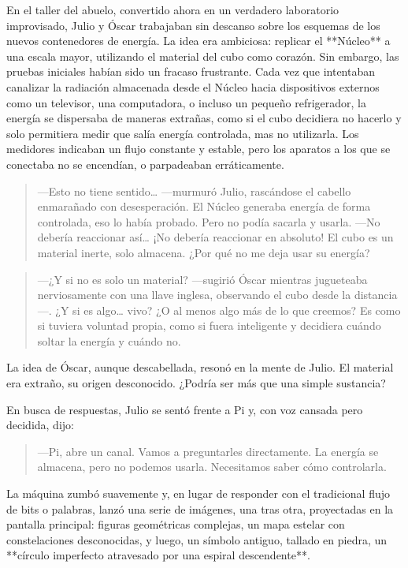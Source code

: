 \documentclass[a4paper,12pt]{book}
\begin{document}
En el taller del abuelo, convertido ahora en un verdadero laboratorio improvisado, Julio y Óscar trabajaban sin descanso sobre los esquemas de los nuevos contenedores de energía. La idea era ambiciosa: replicar el **Núcleo** a una escala mayor, utilizando el material del cubo como corazón. Sin embargo, las pruebas iniciales habían sido un fracaso frustrante. Cada vez que intentaban canalizar la radiación almacenada desde el Núcleo hacia dispositivos externos como un televisor, una computadora, o incluso un pequeño refrigerador, la energía se dispersaba de maneras extrañas, como si el cubo decidiera no hacerlo y solo permitiera medir que salía energía controlada, mas no utilizarla. Los medidores indicaban un flujo constante y estable, pero los aparatos a los que se conectaba no se encendían, o parpadeaban erráticamente.

\begin{quote}
    —Esto no tiene sentido… —murmuró Julio, rascándose el cabello enmarañado con desesperación. El Núcleo generaba energía de forma controlada, eso lo había probado. Pero no podía sacarla y usarla. —No debería reaccionar así… ¡No debería reaccionar en absoluto! El cubo es un material inerte, solo almacena. ¿Por qué no me deja usar su energía?
\end{quote}

\begin{quote}
    —¿Y si no es solo un material? —sugirió Óscar mientras jugueteaba nerviosamente con una llave inglesa, observando el cubo desde la distancia—. ¿Y si es algo… vivo? ¿O al menos algo más de lo que creemos? Es como si tuviera voluntad propia, como si fuera inteligente y decidiera cuándo soltar la energía y cuándo no.
\end{quote}

La idea de Óscar, aunque descabellada, resonó en la mente de Julio. El material era extraño, su origen desconocido. ¿Podría ser más que una simple sustancia?

En busca de respuestas, Julio se sentó frente a Pi y, con voz cansada pero decidida, dijo:

\begin{quote}
    —Pi, abre un canal. Vamos a preguntarles directamente. La energía se almacena, pero no podemos usarla. Necesitamos saber cómo controlarla.
\end{quote}

La máquina zumbó suavemente y, en lugar de responder con el tradicional flujo de bits o palabras, lanzó una serie de imágenes, una tras otra, proyectadas en la pantalla principal: figuras geométricas complejas, un mapa estelar con constelaciones desconocidas, y luego, un símbolo antiguo, tallado en piedra, un **círculo imperfecto atravesado por una espiral descendente**.
\end{document}
